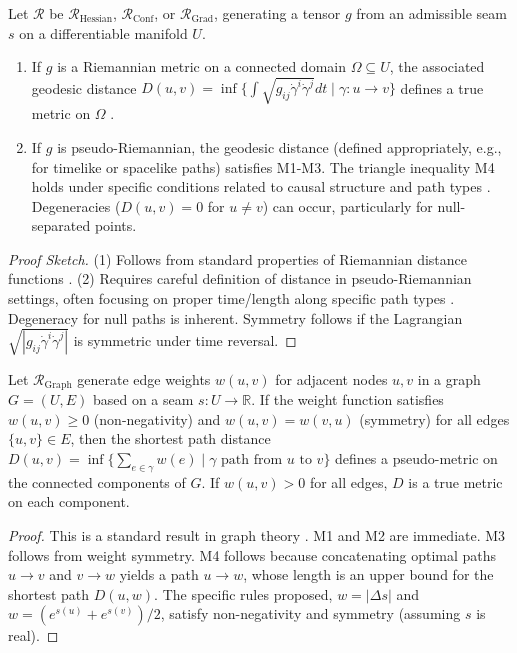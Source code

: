 \documentclass[twoside,twocolumn]{article}
\numberwithin{equation}{section} %
\begin{document}
\begin{proposition} \label{prop:diff_metric_props}
Let \( \mathcal{R} \) be \( \mathcal{R}_{\text{Hessian}} \), \( \mathcal{R}_{\text{Conf}} \), or \( \mathcal{R}_{\text{Grad}} \), generating a tensor \( g \) from an admissible seam \( s \) on a differentiable manifold \( U \).
\begin{enumerate}
    \item If \( g \) is a Riemannian metric on a connected domain \( \Omega \subseteq U \), the associated geodesic distance \( D(u, v) = \inf \{\int \sqrt{g_{ij}\dot{\gamma}^i\dot{\gamma}^j} dt \mid \gamma: u \to v\} \) defines a true metric on \( \Omega \) \cite{Petersen2006, Lee2018}. %
    \item If \( g \) is pseudo-Riemannian, the geodesic distance (defined appropriately, e.g., for timelike or spacelike paths) satisfies M1-M3. The triangle inequality M4 holds under specific conditions related to causal structure and path types \cite{ONeill1983,BeemEhrlichEasley1996}. %
    Degeneracies (\( D(u,v)=0 \) for \( u \neq v \)) can occur, particularly for null-separated points.
\end{enumerate}
\end{proposition}
\begin{proof}[Proof Sketch]
(1) Follows from standard properties of Riemannian distance functions \cite{Petersen2006, Lee2018}. %
(2) Requires careful definition of distance in pseudo-Riemannian settings, often focusing on proper time/length along specific path types \cite{ONeill1983,BeemEhrlichEasley1996}. %
Degeneracy for null paths is inherent. Symmetry follows if the Lagrangian \( \sqrt{|g_{ij}\dot{\gamma}^i\dot{\gamma}^j|} \) is symmetric under time reversal.
\end{proof}

\begin{proposition} \label{prop:graph_metric_props}
Let \( \mathcal{R}_{\text{Graph}} \) generate edge weights \( w(u, v) \) for adjacent nodes \( u, v \) in a graph \( G=(U, E) \) based on a seam \( s: U \to \mathbb{R} \). If the weight function satisfies \( w(u, v) \ge 0 \) (non-negativity) and \( w(u, v) = w(v, u) \) (symmetry) for all edges \( \{u, v\} \in E \), then the shortest path distance \( D(u, v) = \inf \{\sum_{e \in \gamma} w(e) \mid \gamma \text{ path from } u \text{ to } v\} \) defines a pseudo-metric on the connected components of \( G \). If \( w(u,v)>0 \) for all edges, \( D \) is a true metric on each component.
\end{proposition}
\begin{proof}
This is a standard result in graph theory \cite{Chung1997}. %
M1 and M2 are immediate. M3 follows from weight symmetry. M4 follows because concatenating optimal paths \( u \to v \) and \( v \to w \) yields a path \( u \to w \), whose length is an upper bound for the shortest path \( D(u,w) \). The specific rules proposed, \( w=|\Delta s| \) and \( w=(e^{s(u)}+e^{s(v)})/2 \), satisfy non-negativity and symmetry (assuming \( s \) is real).
\end{proof}
\end{document}
